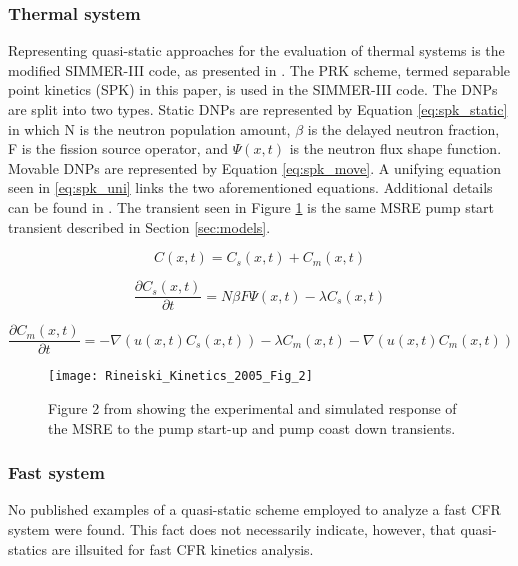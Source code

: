 \documentclass[review]{elsarticle}
\begin{document}
\subsubsection{Thermal system} \label{sssec:qs_therm}
Representing quasi-static approaches for the evaluation of thermal systems
is the modified SIMMER-III code, as presented in \cite{rineiski_kinetics_2005}.
The PRK scheme, termed separable point kinetics (SPK) in this
paper, is used in the SIMMER-III code. The DNPs are split into two types.
Static DNPs are represented by Equation \ref{eq:spk_static} in which N is the
neutron
population amount, $\beta$ is the delayed neutron fraction, F is the fission
source operator, and $\Psi(x,t)$ is the neutron flux shape function.
Movable DNPs are represented by
Equation \ref{eq:spk_move}. A unifying equation seen in \ref{eq:spk_uni} links
the two aforementioned equations.
Additional details can be found in \cite{rineiski_kinetics_2005}. The transient
seen in Figure \ref{fig:rineiski_msre_ps} is the same MSRE pump start transient
described in Section \ref{sec:models}.

\begin{equation}
    \label{eq:spk_uni}
    C(x,t) = C_{s}(x,t) + C_{m}(x,t)
\end{equation}

\begin{equation}
    \label{eq:spk_static}
    \frac{\partial C_{s}(x,t)}{\partial t} = N \beta F \Psi(x,t) -
        \lambda C_{s}(x,t)
\end{equation}
 
\begin{equation}
    \label{eq:spk_move}
    \frac{\partial C_{m}(x,t)}{\partial t} = - \nabla (u(x,t) C_{s}(x,t)) -
        \lambda C_{m}(x,t) - \nabla(u(x,t) C_{m}(x,t))
\end{equation}

\begin{figure}[H]
   \centering
   \texttt{[image: Rineiski\_Kinetics\_2005\_Fig\_2]}
   \caption{Figure 2 from \cite{rineiski_kinetics_2005} showing the experimental and simulated
   response of the MSRE to the pump start-up and pump coast down transients.} 
   \label{fig:rineiski_msre_ps}
\end{figure}

\subsubsection{Fast system} \label{sssec:qs_fast}
No published examples of a quasi-static scheme employed to analyze a fast
CFR system were found. This fact  does not necessarily indicate, however, that
quasi-statics are illsuited for fast CFR kinetics analysis.
\end{document}
